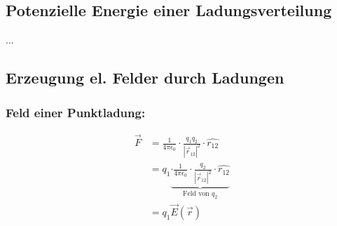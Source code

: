 \documentclass[11pt]{article}
\begin{document}
\subsection{Potenzielle Energie einer Ladungsverteilung}

...

\subsection{Erzeugung el. Felder durch Ladungen}

	\subsubsection{Feld einer Punktladung:}
	
	\begin{align*}
		\vec{F} &= \frac{1}{4\pi\epsilon_0} \cdot \frac{q_1 q_2}{ |\vec{r}_{12}|^2 } \cdot \hat{r_{12}} \\
					&=q_1 \underbrace{ \cdot \frac{1}{4\pi\epsilon_0} \cdot \frac{q_2}{ |\vec{r}_{12}|^2 } \cdot \hat{r_{12}}  }_{\text{Feld von }q_2} \\
					&=q_1 \vec{E}(\vec{r})
	\end{align*}
\end{document}
